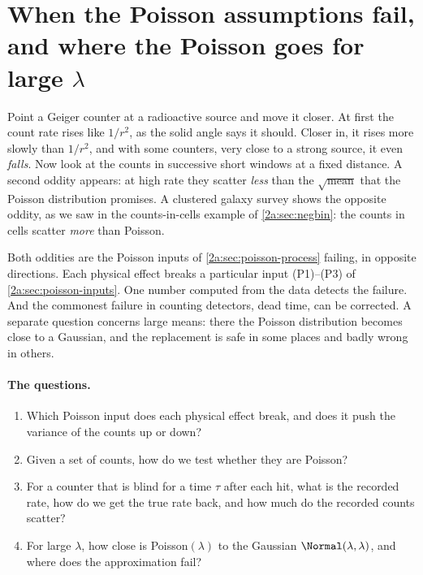 \section{When the Poisson assumptions fail, and where the Poisson goes for large \texorpdfstring{$\lambda$}{lambda}}\label{2a:sec:failures}

Point a Geiger counter at a radioactive source and move it closer. At first the count rate rises like $1/r^2$, as the solid angle says it should. Closer in, it rises more slowly than $1/r^2$, and with some counters, very close to a strong source, it even \emph{falls}. Now look at the counts in successive short windows at a fixed distance. A second oddity appears: at high rate they scatter \emph{less} than the $\sqrt{\text{mean}}$ that the Poisson distribution promises. A clustered galaxy survey shows the opposite oddity, as we saw in the counts-in-cells example of \cref{2a:sec:negbin}: the counts in cells scatter \emph{more} than Poisson.

Both oddities are the Poisson inputs of \cref{2a:sec:poisson-process} failing, in opposite directions. Each physical effect breaks a particular input (P1)--(P3) of \cref{2a:sec:poisson-inputs}. One number computed from the data detects the failure. And the commonest failure in counting detectors, dead time, can be corrected. A separate question concerns large means: there the Poisson distribution becomes close to a Gaussian, and the replacement is safe in some places and badly wrong in others.

\paragraph{The questions.}
\begin{enumerate}[leftmargin=1.6em,itemsep=1pt]
  \item Which Poisson input does each physical effect break, and does it push the variance of the counts up or down?
  \item Given a set of counts, how do we test whether they are Poisson?
  \item For a counter that is blind for a time $\tau$ after each hit, what is the recorded rate, how do we get the true rate back, and how much do the recorded counts scatter?
  \item For large $\lambda$, how close is Poisson$(\lambda)$ to the Gaussian $\Normal(\lambda,\lambda)$, and where does the approximation fail?
\end{enumerate}

